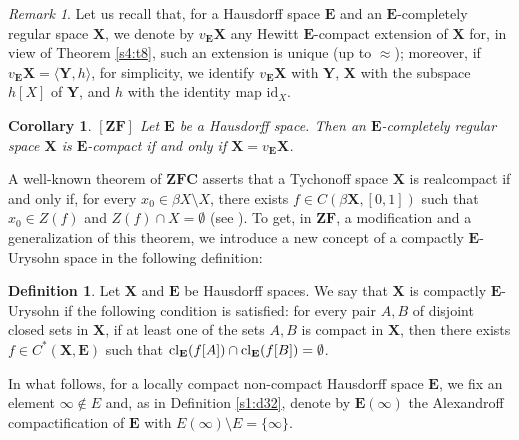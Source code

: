 \documentclass[12pt,twoside,leqno]{article}
\theoremstyle{plain}
\newtheorem{corollary}[theorem]{Corollary}
\theoremstyle{definition}
\newtheorem{definition}[theorem]{Definition}
\theoremstyle{remark}
\newtheorem{remark}[theorem]{Remark}
\DeclareMathOperator{\cl}{{\rm cl}}
\begin{document}
\begin{remark}
	\label{s4:r9}
	Let us recall that, for a Hausdorff space $\mathbf{E}$ and an $\mathbf{E}$-completely regular space $\mathbf{X}$, we denote by $v_{\mathbf{E}}\mathbf{X}$ any Hewitt $\mathbf{E}$-compact extension of $\mathbf{X}$ for, in view of Theorem \ref{s4:t8}, such an extension is unique (up to $\approx$); moreover, if $v_{\mathbf{E}}\mathbf{X}=\langle \mathbf{Y}, h\rangle$, for simplicity, we identify $v_{\mathbf{E}}\mathbf{X}$ with $\mathbf{Y}$, $\mathbf{X}$ with the subspace $h[X]$ of $\mathbf{Y}$, and $h$ with the identity map $\text{id}_{X}$. 
\end{remark}

\begin{corollary}
	\label{s4:c10}
	$[\mathbf{ZF}]$ Let $\mathbf{E}$ be a Hausdorff space. Then an $\mathbf{E}$-completely regular space $\mathbf{X}$ is $\mathbf{E}$-compact if and only if $\mathbf{X}=v_{\mathbf{E}}\mathbf{X}$.
\end{corollary}

A well-known theorem of $\mathbf{ZFC}$ asserts that a Tychonoff space $\mathbf{X}$ is realcompact if and only if, for every $x_0\in\beta X\setminus X$, there exists $f\in C(\beta\mathbf{X}, [0,1])$ such that $x_0\in Z(f)$ and $Z(f)\cap X=\emptyset$ (see \cite[Theorem 3.11.10]{en}). To get, in $\mathbf{ZF}$, a modification and a generalization of this theorem, we introduce a new concept of a compactly $\mathbf{E}$-Urysohn space in the following definition:

\begin{definition}
	\label{s4:d11}
	Let $\mathbf{X}$ and $\mathbf{E}$ be Hausdorff spaces. We say that $\mathbf{X}$ is compactly $\mathbf{E}$-Urysohn if the following condition is satisfied: for every pair $A, B$ of disjoint closed sets in $\mathbf{X}$, if at least one of the sets $A, B$ is compact in $\mathbf{X}$, then there exists $f\in C^{\ast}(\mathbf{X}, \mathbf{E})$ such that $\cl_{\mathbf{E}}(f[A])\cap\cl_{\mathbf{E}}(f[B])=\emptyset$. 
\end{definition}

In what follows, for a locally compact non-compact Hausdorff space $\mathbf{E}$, we fix an element $\infty\notin E$ and, as in Definition \ref{s1:d32}, denote by $\mathbf{E}(\infty)$ the Alexandroff compactification of $\mathbf{E}$ with $E(\infty)\setminus E=\{\infty\}$.
\end{document}
